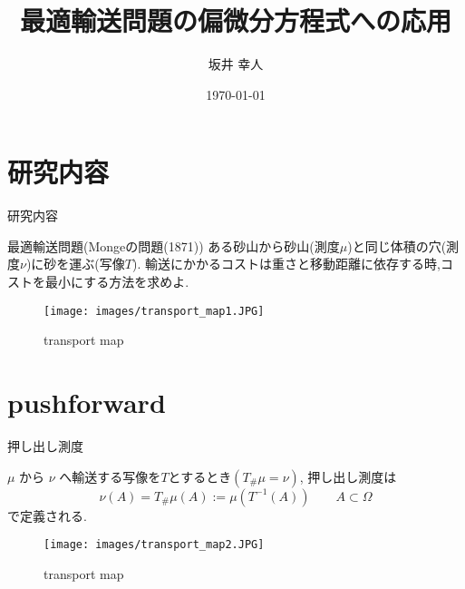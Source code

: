 \documentclass[aspectratio=169, dvipdfmx, 12pt]{beamer}
\title{最適輸送問題の偏微分方程式への応用}
\author[坂井 幸人]{坂井 幸人}
\institute[数物科学専攻 1年]{数物科学専攻 1年}
\date{\today}
\begin{document}
\frame{\maketitle}


\begin{comment}
\begin{frame}{目次}
    \tableofcontents
\end{frame}
\end{comment}


\section{研究内容}
\begin{frame}{研究内容}
    \begin{block}{最適輸送問題(Mongeの問題(1871))}
        ある砂山から砂山(測度$\mu$)と同じ体積の穴(測度$\nu$)に砂を運ぶ(写像$T$).
        輸送にかかるコストは重さと移動距離に依存する時,コストを最小にする方法を求めよ.
    \end{block}
\begin{figure}[htbp]
	\begin{center}
        \texttt{[image: images/transport\_map1.JPG]}
        \caption{transport map}
	\end{center}
\end{figure}
\end{frame}

\section{pushforward}
\begin{frame}{押し出し測度}
    
    \begin{definition}
        $\mu$ から $\nu$ へ輸送する写像を$T$とするとき$(T_\#\mu = \nu)$,
        押し出し測度は
        \begin{equation*}
            \nu (A) =  T_\#\mu (A) := \mu (T^{-1} (A)) \qquad A \subset \Omega
        \end{equation*}
        で定義される.
    \end{definition}

    \begin{figure}[htbp]
        \begin{center}
            \texttt{[image: images/transport\_map2.JPG]}
            \caption{transport map}
        \end{center}
    \end{figure}
\end{frame}
\end{document}

